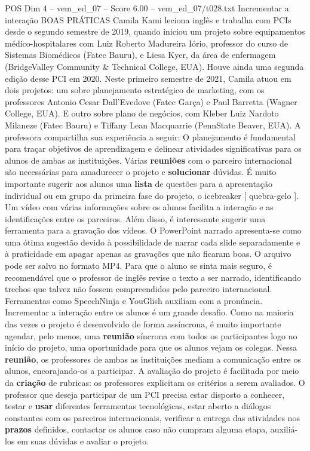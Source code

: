 \begin{textsample}{POS Dim 4 – vem\_ed\_07 – Score 6.00 – vem\_ed\_07/t028.txt}  \label{ex:f4_pos_036}
Incrementar a interação BOAS PRÁTICAS Camila Kami leciona inglês e trabalha com PCIs desde o segundo semestre de 2019, quando iniciou um projeto sobre equipamentos médico-hospitalares com Luiz Roberto Madureira Iório, professor do curso de Sistemas Biomédicos (Fatec Bauru), e Liesa Kyer, da área de enfermagem (BridgeValley Community \& Technical College, EUA).
Houve ainda uma segunda edição desse PCI em 2020.
Neste primeiro semestre de 2021, Camila atuou em dois projetos: um sobre planejamento estratégico de marketing, com os professores Antonio Cesar Dall’Evedove (Fatec Garça) e Paul Barretta (Wagner College, EUA).
E outro sobre plano de negócios, com Kleber Luiz Nardoto Milaneze (Fatec Bauru) e Tiffany Lean Macquarrie (PennState Beaver, EUA).
A professora compartilha sua experiência a seguir: O planejamento é fundamental para traçar objetivos de aprendizagem e delinear atividades significativas para os alunos de ambas as instituições.
Várias \textbf{reuniões} com o parceiro internacional são necessárias para amadurecer o projeto e \textbf{solucionar} dúvidas.
É muito importante sugerir aos alunos uma \textbf{lista} de questões para a apresentação individual ou em grupo da primeira fase do projeto, o icebreaker [ quebra-gelo ].
Um vídeo com várias informações sobre os alunos facilita a interação e as identificações entre os parceiros.
Além disso, é interessante sugerir uma ferramenta para a gravação dos vídeos.
O PowerPoint narrado apresenta-se como uma ótima sugestão devido à possibilidade de narrar cada slide separadamente e à praticidade em apagar apenas as gravações que não ficaram boas.
O arquivo pode ser salvo no formato MP4.
Para que o aluno se sinta mais seguro, é recomendável que o professor de inglês revise o texto a ser narrado, identificando trechos que talvez não fossem compreendidos pelo parceiro internacional.
Ferramentas como SpeechNinja e YouGlish auxiliam com a pronúncia.
Incrementar a interação entre os alunos é um grande desafio.
Como na maioria das vezes o projeto é desenvolvido de forma assíncrona, é muito importante agendar, pelo menos, uma \textbf{reunião} síncrona com todos os participantes logo no início do projeto, uma oportunidade para que os alunos vejam os colegas.
Nessa \textbf{reunião}, os professores de ambas as instituições mediam a comunicação entre os alunos, encorajando-os a participar.
A avaliação do projeto é facilitada por meio da \textbf{criação} de rubricas: os professores explicitam os critérios a serem avaliados.
O professor que deseja participar de um PCI precisa estar disposto a conhecer, testar e \textbf{usar} diferentes ferramentas tecnológicas, estar aberto a diálogos constantes com os parceiros internacionais, verificar a entrega das atividades nos \textbf{prazos} definidos, contactar os alunos caso não cumpram alguma etapa, auxiliá-los em suas dúvidas e avaliar o projeto.

\end{textsample}
